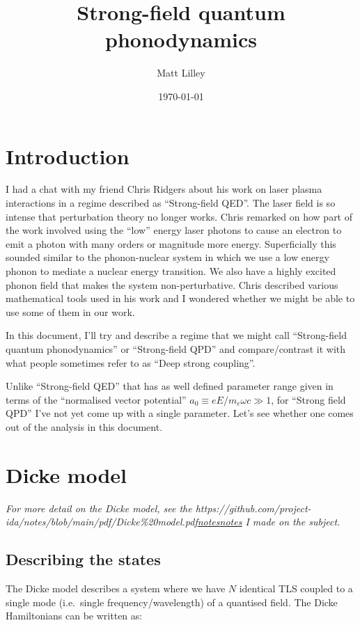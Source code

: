 \documentclass[
]{article}
\title{Strong-field quantum phonodynamics}
\author{Matt Lilley}
\date{\today}  %
\let\oldhref\href
\renewcommand{\href}[2]{\ifx#1\urlprefix\oldhref{#1}{#2}\else\uline{\oldhref{#1}{#2}}\fi}
\renewcommand{\[}{\begin{equation}}
\renewcommand{\]}{\end{equation}}
\begin{document}
\maketitle

\section{Introduction}\label{introduction}

I had a chat with my friend Chris Ridgers about his work on laser plasma
interactions in a regime described as ``Strong-field QED''. The laser
field is so intense that perturbation theory no longer works. Chris
remarked on how part of the work involved using the ``low'' energy laser
photons to cause an electron to emit a photon with many orders or
magnitude more energy. Superficially this sounded similar to the
phonon-nuclear system in which we use a low energy phonon to mediate a
nuclear energy transition. We also have a highly excited phonon field
that makes the system non-perturbative. Chris described various
mathematical tools used in his work and I wondered whether we might be
able to use some of them in our work.

In this document, I'll try and describe a regime that we might call
``Strong-field quantum phonodynamics'' or ``Strong-field QPD'' and
compare/contrast it with what people sometimes refer to as ``Deep strong
coupling''.

Unlike ``Strong-field QED'' that has as well defined parameter range
given in terms of the ``normalised vector potential''
\(a_0\equiv eE/m_e\omega c\gg 1\), for ``Strong field QPD'' I've not yet
come up with a single parameter. Let's see whether one comes out of the
analysis in this document.

\section{Dicke model}\label{dicke-model}

\emph{For more detail on the Dicke model, see the
\href{https://github.com/project-ida/notes/blob/main/pdf/Dicke\%20model.pdf}{notes}
I made on the subject.}

\subsection{Describing the states}\label{describing-the-states}

The Dicke model describes a system where we have \(N\) identical TLS
coupled to a single mode (i.e.~single frequency/wavelength) of a
quantised field. The Dicke Hamiltonians can be written as:
\end{document}
